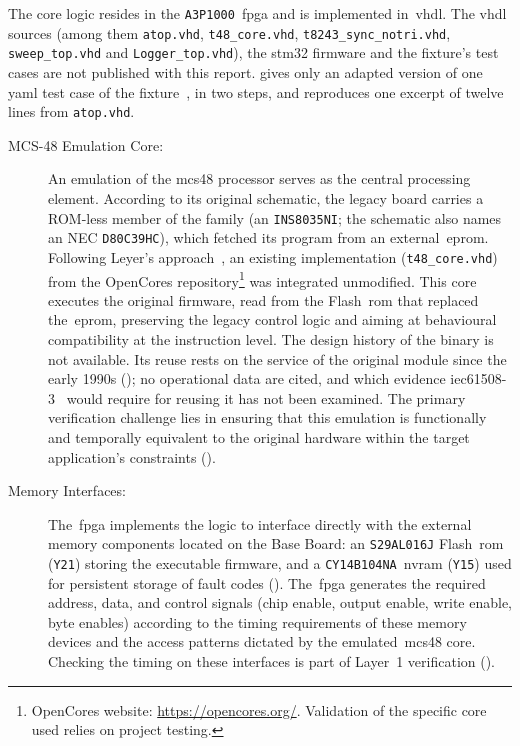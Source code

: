 The core logic resides in the \texttt{A3P1000}~\gls{fpga} and is implemented in~\gls{vhdl}. The \gls{vhdl} sources (among them \texttt{atop.vhd}, \texttt{t48\_core.vhd}, \texttt{t8243\_sync\_notri.vhd}, \texttt{sweep\_top.vhd} and \texttt{Logger\_top.vhd}), the \gls{stm32} firmware and the fixture's test cases are not published with this report.  gives only an adapted version of one \gls{yaml} test case of the fixture~\cite[Listing~3]{dolata2023}, in two steps, and reproduces one excerpt of twelve lines from \texttt{atop.vhd}.

\begin{description}
	\item[MCS-48 Emulation Core:] An emulation of the \gls{mcs48} processor serves as the central processing element. According to its original schematic, the legacy board carries a ROM-less member of the family (an \texttt{INS8035NI}; the schematic also names an NEC \texttt{D80C39HC}), which fetched its program from an external~\gls{eprom}. Following Leyer's approach~\cite{leyer2023}, an existing implementation (\texttt{t48\_core.vhd}) from the OpenCores repository\footnote{OpenCores website: \url{https://opencores.org/}. Validation of the specific core used relies on project testing.} was integrated unmodified. This core executes the original firmware, read from the Flash~\gls{rom} that replaced the~\gls{eprom}, preserving the legacy control logic and aiming at behavioural compatibility at the instruction level. The design history of the binary is not available. Its reuse rests on the service of the original module since the early 1990s (); no operational data are cited, and which evidence \mbox{\gls{iec61508}-3}~\cite{iec61508_3_2010} would require for reusing it has not been examined. The primary verification challenge lies in ensuring that this emulation is functionally and temporally equivalent to the original hardware within the target application's constraints ().
	\item[Memory Interfaces:] The~\gls{fpga} implements the logic to interface directly with the external memory components located on the Base Board: an \texttt{S29AL016J} Flash~\gls{rom} (\texttt{Y21}) storing the executable firmware, and a \texttt{CY14B104NA}~\gls{nvram} (\texttt{Y15}) used for persistent storage of fault codes (). The~\gls{fpga} generates the required address, data, and control signals (chip enable, output enable, write enable, byte enables) according to the timing requirements of these memory devices and the access patterns dictated by the emulated~\gls{mcs48} core. Checking the timing on these interfaces is part of Layer~1 verification ().

\end{description}
